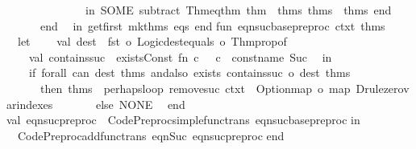 \begin{isabellebody}
\ \ \ \ \ \ \ \ \ \ \ \ \ \ in\ SOME\ {\isacharparenleft}subtract\ Thm{\isachardot}eq{\isacharunderscore}thm\ {\isacharparenleft}thm\ {\isacharcolon}{\isacharcolon}\ thms{}{\isacharparenright}\ thms\ {\isacharat}\ thms{}{\isacharparenright}\ end\isanewline
\ \ \ \ \ \ end\isanewline
\ \ in\ get{\isacharunderscore}first\ mk{\isacharunderscore}thms\ eqs\ end{\isacharsemicolon}\isanewline
\isanewline
fun\ eqn{\isacharunderscore}suc{\isacharunderscore}base{\isacharunderscore}preproc\ ctxt\ thms\ {\isacharequal}\isanewline
\ \ let\isanewline
\ \ \ \ val\ dest\ {\isacharequal}\ fst\ o\ Logic{\isachardot}dest{\isacharunderscore}equals\ o\ Thm{\isachardot}prop{\isacharunderscore}of{\isacharsemicolon}\isanewline
\ \ \ \ val\ contains{\isacharunderscore}suc\ {\isacharequal}\ exists{\isacharunderscore}Const\ {\isacharparenleft}fn\ {\isacharparenleft}c{\isacharcomma}\ {\isacharunderscore}{\isacharparenright}\ {\isacharequal}{\isachargreater}\ c\ {\isacharequal}\ {\isacharat}{\isacharbraceleft}const{\isacharunderscore}name\ Suc{\isacharbraceright}{\isacharparenright}{\isacharsemicolon}\isanewline
\ \ in\isanewline
\ \ \ \ if\ forall\ {\isacharparenleft}can\ dest{\isacharparenright}\ thms\ andalso\ exists\ {\isacharparenleft}contains{\isacharunderscore}suc\ o\ dest{\isacharparenright}\ thms\isanewline
\ \ \ \ \ \ then\ thms\ {\isacharbar}{\isachargreater}\ perhaps{\isacharunderscore}loop\ {\isacharparenleft}remove{\isacharunderscore}suc\ ctxt{\isacharparenright}\ {\isacharbar}{\isachargreater}\ {\isacharparenleft}Option{\isachardot}map\ o\ map{\isacharparenright}\ Drule{\isachardot}zero{\isacharunderscore}var{\isacharunderscore}indexes\isanewline
\ \ \ \ \ \ \ else\ NONE\isanewline
\ \ end{\isacharsemicolon}\isanewline
\isanewline
val\ eqn{\isacharunderscore}suc{\isacharunderscore}preproc\ {\isacharequal}\ Code{\isacharunderscore}Preproc{\isachardot}simple{\isacharunderscore}functrans\ eqn{\isacharunderscore}suc{\isacharunderscore}base{\isacharunderscore}preproc{\isacharsemicolon}\isanewline
\isanewline
in\isanewline
\isanewline
\ \ Code{\isacharunderscore}Preproc{\isachardot}add{\isacharunderscore}functrans\ {\isacharparenleft}{\isachardoublequote}eqn{\isacharunderscore}Suc{\isachardoublequote}{\isacharcomma}\ eqn{\isacharunderscore}suc{\isacharunderscore}preproc{\isacharparenright}\isanewline
\isanewline
end{\isacharsemicolon}\isanewline
{\isacartoucheclose}%
\endisatagML
{\isafoldML}%
%
\isadelimML
%
\endisadelimML
\isanewline
%
\isadelimtheory
\isanewline
%
\endisadelimtheory
%
\isatagtheory
{}\isamarkupfalse%
%
\endisatagtheory
{\isafoldtheory}%
%
\isadelimtheory
%
\endisadelimtheory
%
\end{isabellebody}%
